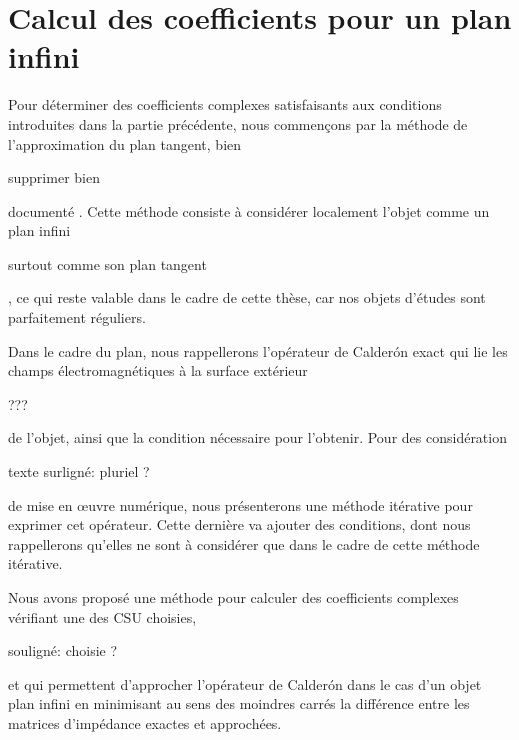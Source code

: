 \chapter{Calcul des coefficients pour un plan infini}
\label{sec:plan}
\minitoc
\newpage

Pour déterminer des coefficients complexes satisfaisants aux conditions introduites dans la partie précédente, nous commençons par la méthode de l'approximation du plan tangent, bien
\begin{REM}
  supprimer bien
\end{REM} documenté \cite{hoppe_impedance_1995,marceaux_high-order_2000,aubakirov_electromagnetic_2014}. Cette méthode consiste à considérer localement l'objet comme un plan infini
\begin{REM}
  surtout comme son plan tangent
\end{REM}, ce qui reste valable dans le cadre de cette thèse, car nos objets d'études sont parfaitement réguliers.

Dans le cadre du plan, nous rappellerons l'opérateur de Calderón exact qui lie les champs électromagnétiques à la surface extérieur
\begin{REM}
  ???
\end{REM} de l’objet, ainsi que la condition nécessaire pour l'obtenir.
Pour des considération
\begin{REM}
  texte surligné: pluriel ?
\end{REM} de mise en œuvre numérique, nous présenterons une méthode itérative pour exprimer cet opérateur.
Cette dernière va ajouter des conditions, dont nous rappellerons qu'elles ne sont à considérer que dans le cadre de cette méthode itérative.








Nous avons proposé une méthode pour calculer des coefficients complexes vérifiant une des CSU choisies,
\begin{REM}
  souligné: choisie ?
\end{REM} 
 et qui permettent d'approcher l'opérateur de Calderón dans le cas d'un objet plan infini en minimisant au sens des moindres carrés la différence entre les matrices d'impédance exactes et approchées.

